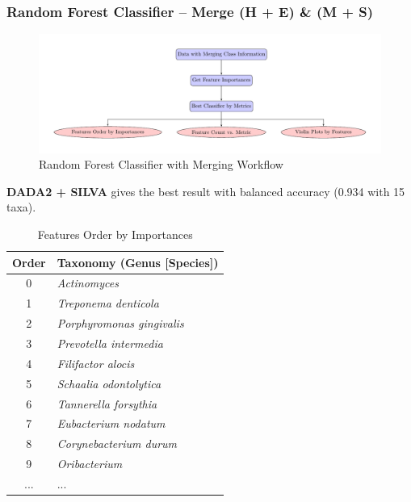 \documentclass{beamer}
\begin{document}
    \begin{frame}[allowframebreaks]
        \frametitle{Random Forest Classifier -- Merge (H + E) \& (M + S)}

        \begin{figure}
            \includegraphics[width=0.8 \linewidth]{figures/RandomForest/merge.pdf}
            \caption{Random Forest Classifier with Merging Workflow}
        \end{figure}

        \textbf{DADA2 + SILVA} gives the best result with balanced accuracy (0.934 with 15 taxa).

        \begin{table}
            \caption{Features Order by Importances}
            \begin{tabular}{c|l}
                Order & Taxonomy (Genus [Species]) \\ \hline
                0 & \textit{Actinomyces} \\
                1 & \textit{Treponema denticola} \\
                2 & \textit{Porphyromonas gingivalis} \\
                3 & \textit{Prevotella intermedia} \\
                4 & \textit{Filifactor alocis} \\
                5 & \textit{Schaalia odontolytica} \\
                6 & \textit{Tannerella forsythia} \\
                7 & \textit{Eubacterium nodatum} \\
                8 & \textit{Corynebacterium durum} \\
                9 & \textit{Oribacterium} \\
                ... & ... \\
            \end{tabular}
        \end{table}


\end{frame}
\end{document}
